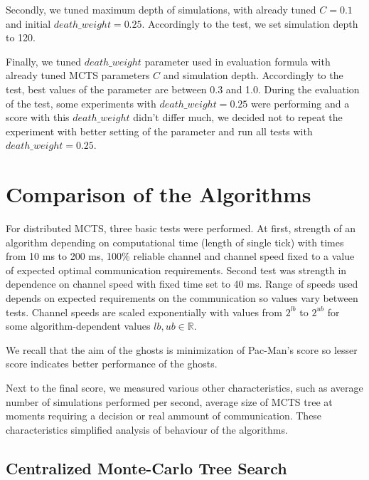 Secondly, we tuned maximum depth of simulations, with already tuned $C=0.1$ and initial
$death\_weight=0.25$. Accordingly to the test, we set simulation depth to 120.

Finally, we tuned $death\_weight$ parameter used in evaluation formula with already tuned MCTS
parameters $C$ and simulation depth. Accordingly to the test, best values of the parameter are
between 0.3 and 1.0. During the evaluation of the test, some experiments with
$death\_weight=0.25$ were performing and a score with this $death\_weight$ didn't differ much,
we decided not to repeat the experiment with better setting of the parameter and run all tests
with $death\_weight=0.25$.



\section{Comparison of the Algorithms}
\label{sec_dmcts_experiments_comparison}


For distributed MCTS, three basic tests were performed. At first, strength of an algorithm
depending on computational time (length of single tick) with times from 10 ms to 200 ms, 100\%
reliable channel and channel speed fixed to a value of expected optimal communication
requirements. Second
test was strength in dependence on channel speed with fixed time set to 40 ms. Range of speeds
used depends on expected requirements on the communication so values
vary between tests. Channel speeds are scaled exponentially with values from $2^{lb}$ to
$2^{ub}$ for some algorithm-dependent values $lb,ub \in \mathbb{R}$.

We recall that the aim of the ghosts is minimization of Pac-Man's score so lesser score indicates
better performance of the ghosts.

Next to the final score, we measured various other characteristics, such as average number of simulations
performed per second, average size of MCTS tree at moments requiring a decision or real ammount
of communication. These characteristics simplified analysis of behaviour of the algorithms.


\subsection{Centralized Monte-Carlo Tree Search}


